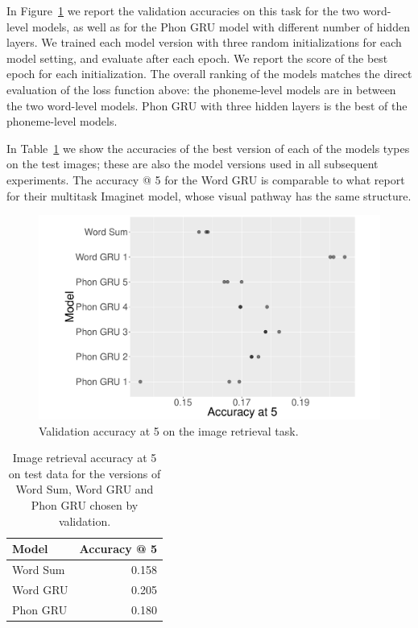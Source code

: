 In Figure~\ref{fig:accat5} we report the validation accuracies on this
task for the two word-level models, as well as for the Phon GRU
model with different number of hidden layers. We trained each model
version with three random initializations for each model setting, and
evaluate after each epoch. We report the score of the best epoch for
each initialization. 
The overall ranking of the models matches the direct
evaluation of the loss function above: the phoneme-level models are in
between the two word-level models. {\sc Phon GRU} with three
hidden layers is the best of the phoneme-level models.

In Table~\ref{tab:accat5test} we show the accuracies of the best
version of each of the models types on the test images; these are also
the model versions used in all subsequent experiments. The accuracy @ 5 for the {\sc Word GRU} is comparable to what
 report for their multitask {\sc Imaginet}
model, whose visual pathway has the same structure.


\begin{figure}
  \centering
  \includegraphics[scale=0.25]{accat5.pdf}
  \caption{Validation accuracy at 5 on the image retrieval task.}
  \label{fig:accat5}
\end{figure}


\begin{table}
  \centering
  \begin{tabular}{l|r}
    Model & Accuracy @ 5 \\\hline
    {\sc Word Sum} & 0.158 \\
    {\sc Word GRU} & 0.205 \\
    {\sc Phon GRU} & 0.180 \\
  \end{tabular}
  \caption{Image retrieval accuracy at 5 on test data for the versions of {\sc Word
      Sum}, {\sc Word GRU} and {\sc Phon GRU} chosen by
    validation.}
  \label{tab:accat5test}
\end{table}

